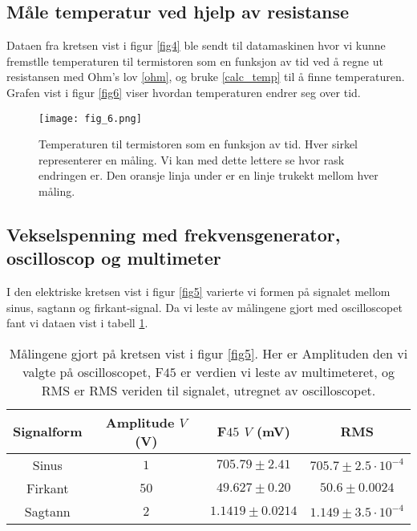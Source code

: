 \documentclass[%
 reprint,
 amsmath,amssymb,
 aps,
]{revtex4-1}
\begin{document}
\subsection{Måle temperatur ved hjelp av resistanse}
Dataen fra kretsen vist i figur \ref{fig4} ble sendt til datamaskinen hvor vi kunne fremstlle temperaturen til termistoren som en funksjon av tid ved å regne ut resistansen med Ohm's lov \eqref{ohm}, og bruke \eqref{calc_temp} til å finne temperaturen. Grafen vist i figur \ref{fig6} viser hvordan temperaturen endrer seg over tid.
\begin{figure}[h!]
  \centering
  \texttt{[image: fig\_6.png]}
  \caption{Temperaturen til termistoren som en funksjon av tid. Hver sirkel representerer en måling. Vi kan med dette lettere se hvor rask endringen er. Den oransje linja under er en linje trukekt mellom hver måling.}
  \label{fig6s}
\end{figure}

\subsection{Vekselspenning med frekvensgenerator, oscilloscop og multimeter}
I den elektriske kretsen vist i figur \ref{fig5} varierte vi formen på signalet mellom sinus, sagtann og firkant-signal. Da vi leste av målingene gjort med oscilloscopet fant vi dataen vist i tabell \ref{table5}.
\begin{table}[h!]
\centering
\caption{Målingene gjort på kretsen vist i figur \ref{fig5}. Her er Amplituden den vi valgte på oscilloscopet, F$45$ er verdien vi leste av multimeteret, og RMS er RMS veriden til signalet, utregnet av oscilloscopet.}
\label{table5}
\begin{tabular}{c c c c}
\toprule
    Signalform & Amplitude $V$ (V) & F$45$ $V$ (mV)  & RMS \\ \hline
 Sinus   &    $1$  &                  $705.79 \pm 2.41$ &      $705.7 \pm 2.5 \cdot 10^{-4}$ \\
 Firkant &   $ 50$ &                  $49.627 \pm 0.20$ &      $50.6 \pm 0.0024$\\
 Sagtann &    $2$  &                  $1.1419 \pm 0.0214$ &    $1.149 \pm 3.5 \cdot 10^{-4}  $ \\
\end{tabular}
\end{table}
\end{document}
